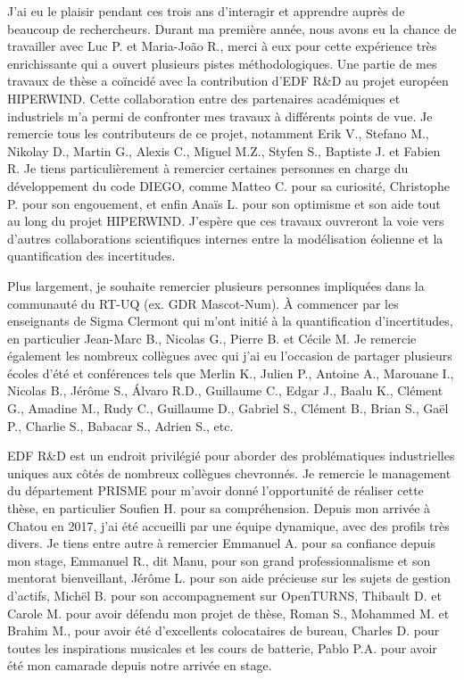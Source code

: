 {J'ai eu le plaisir pendant ces trois ans d'interagir et apprendre auprès de beaucoup de rechercheurs. 
Durant ma première année, nous avons eu la chance de travailler avec Luc P. et Maria-Jo\~ao R., merci à eux pour cette expérience très enrichissante qui a ouvert plusieurs pistes méthodologiques. 
Une partie de mes travaux de thèse a co\"incidé avec la contribution d'EDF R\&D au projet européen HIPERWIND. 
Cette collaboration entre des partenaires académiques et industriels m'a permi de confronter mes travaux à différents points de vue. 
Je remercie tous les contributeurs de ce projet, notamment Erik V., Stefano M., Nikolay D., Martin G., Alexis C., Miguel M.Z., Styfen S., Baptiste J. et Fabien R. 
Je tiens particulièrement à remercier certaines personnes en charge du développement du code DIEGO, comme Matteo C. pour sa curiosité, Christophe P. pour son engouement, et enfin Anaïs L. pour son optimisme et son aide tout au long du projet HIPERWIND. 
J'espère que ces travaux ouvreront la voie vers d'autres collaborations scientifiques internes entre la modélisation éolienne et la quantification des incertitudes. 


Plus largement, je souhaite remercier plusieurs personnes impliquées dans la communauté du RT-UQ (ex. GDR Mascot-Num). 
À commencer par les enseignants de Sigma Clermont qui m'ont initié à la quantification d'incertitudes, en particulier Jean-Marc B., Nicolas G., Pierre B. et Cécile M.  
Je remercie également les nombreux collègues avec qui j'ai eu l'occasion de partager plusieurs écoles d'été et conférences tels que 
Merlin K., Julien P., Antoine A., Marouane I., Nicolas B., Jérôme S., \'Alvaro R.D., Guillaume C., Edgar J., Baalu K.,
Clément G., Amadine M., Rudy C., Guillaume D., Gabriel S., Clément B., Brian S., Ga\"el P., Charlie S., Babacar S., Adrien S., etc. 

EDF R\&D est un endroit privilégié pour aborder des problématiques industrielles uniques aux côtés de nombreux collègues chevronnés.
Je remercie le management du département PRISME pour m'avoir donné l'opportunité de réaliser cette thèse, en particulier Soufien H. pour sa compréhension.  
Depuis mon arrivée à Chatou en 2017, j'ai été accueilli par une équipe dynamique, avec des profils très divers. 
Je tiens entre autre à remercier Emmanuel A. pour sa confiance depuis mon stage, 
Emmanuel R., dit Manu, pour son grand professionnalisme et son mentorat bienveillant, 
Jérôme L. pour son aide précieuse sur les sujets de gestion d'actifs, 
Mich\"el B. pour son accompagnement sur OpenTURNS, 
Thibault D. et Carole M. pour avoir défendu mon projet de thèse, 
Roman S., Mohammed M. et Brahim M., pour avoir été d'excellents colocataires de bureau, 
Charles D. pour toutes les inspirations musicales et les cours de batterie, 
Pablo P.A. pour avoir été mon camarade depuis notre arrivée en stage. 

}
